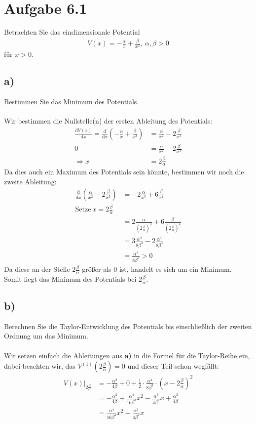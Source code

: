\documentclass{theozettel}
\begin{document}

\section*{Aufgabe 6.1} 
Betrachten Sie das eindimensionale Potential
\begin{align*}
V\left(x\right)=-\frac{\alpha}{x}+\frac{\beta}{x^2}, \ \alpha,\beta>0
\end{align*}
für $x>0$.
\subsection*{a)}
Bestimmen Sie das Minimum des Potentials.\\\\
Wir bestimmen die Nullstelle(n) der ersten Ableitung des Potentials:
\begin{align*}
\frac{\text{d}V\left(x\right)}{\text{d}x}=\frac{\text{d}}{\text{d}x}\left(-\frac{\alpha}{x}+\frac{\beta}{x^2}\right)&=\frac{\alpha}{x^2}-2\frac{\beta}{x^3}\\
0&=\frac{\alpha}{x^2}-2\frac{\beta}{x^3}\\
\Rightarrow x&=2\frac{\beta}{\alpha}
\end{align*}
Da dies auch ein Maximum des Potentials sein könnte, bestimmen wir noch die zweite Ableitung:
\begin{align*}
\frac{\text{d}}{\text{d}x}\left(\frac{\alpha}{x^2}-2\frac{\beta}{x^3}\right)&=-2\frac{\alpha}{x^3}+6\frac{\beta}{x^4}\\
\text{Setze} \ x=2\frac{\beta}{\alpha}&\\
&=2\frac{\alpha}{\left(2\frac{\beta}{\alpha}\right)^3}
+6\frac{\beta}{\left(2\frac{\beta}{\alpha}\right)^4}\\
&=3\frac{\alpha^4}{8\beta^3}-2\frac{\alpha^4}{8\beta^3}\\
&=\frac{\alpha^4}{8\beta^3}>0
\end{align*}
Da diese an der Stelle $2\frac{\beta}{\alpha}$ größer als $0$ ist, handelt es sich um ein Minimum.\\
Somit liegt das Minimum des Potentials bei $2\frac{\beta}{\alpha}$.
\subsection*{b)}
Berechnen Sie die Taylor-Entwicklung des Potentials bis einschließlich der zweiten Ordnung um das Minimum.\\\\
Wir setzen einfach die Ableitungen aus \textbf{a)} in die Formel für die Taylor-Reihe ein, dabei beachten wir, das $V^{\left(1\right)}\left(2\frac{\beta}{\alpha}\right)=0$ und dieser Teil schon wegfällt:
\begin{align*}
V\left(x\right)\big|_{2\frac{\beta}{\alpha}}&=-\frac{\alpha^2}{4\beta}+0+\frac{1}{2}\cdot\frac{\alpha^4}{8\beta^3}\cdot\left(x-2\frac{\beta}{\alpha}\right)^2\\
&=-\frac{\alpha^2}{4\beta}+\frac{\alpha^4}{16\beta^3}x^2-\frac{\alpha^3}{4\beta^2}x+\frac{\alpha^2}{4\beta}\\
&=\frac{\alpha^4}{16\beta^3}x^2-\frac{\alpha^3}{4\beta^2}x
\end{align*}
\end{document}
